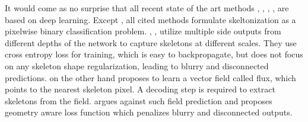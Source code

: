 It would come as no surprise that all recent state of the art methods \cite{Shen2016}, \cite{Shen2017}, \cite{Ke2017}, \cite{Wang2019}, \cite{Xu2019}
are based on deep learning. Except \cite{Wang2019}, all cited methods formulate skeltonization as a pixelwise binary classification problem. \cite{Shen2016}, \cite{Shen2017}, \cite{Ke2017} utilize multiple side outputs from different depths of the network to capture skeletons at different scales. They use cross entropy loss for training, which is easy to backpropagate, but does not focus on any skeleton shape regularization, leading to blurry and disconnected predictions.
\cite{Wang2019} on the other hand proposes to learn a vector field called flux, which points to the nearest skeleton pixel. A decoding step is required to extract skeletons from the field. 
\cite{Xu2019} argues against such field prediction and proposes geometry aware loss function which penalizes blurry and disconnected outputs.